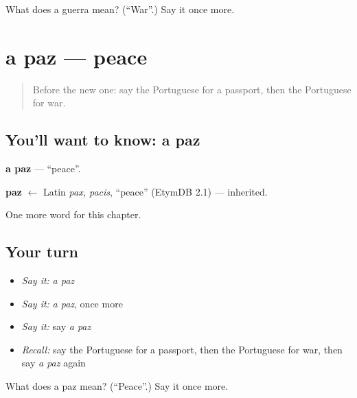 \begin{tcolorbox}[breakable,colback=teal!4,colframe=teal!35!black,title={Before you move on}]
What does a guerra mean? (\textquotedblleft{}War\textquotedblright{}.) Say it once more.
\end{tcolorbox}
\section[a paz]{a paz — peace}

\label{lesson:PT-C219-paz}



\begin{quote}
Before the new one: say the Portuguese for a passport, then the Portuguese for war.
\end{quote}

\subsection*{You'll want to know: a paz}
\textbf{a paz} — \textquotedblleft{}peace\textquotedblright{}.

\begin{cousinweb}
\textbf{paz} $\leftarrow$ Latin \emph{pax, pacis}, \textquotedblleft{}peace\textquotedblright{} (EtymDB 2.1) — inherited.
\end{cousinweb}

\begin{grammarlens}[title={What you've built}]
One more word for this chapter.
\end{grammarlens}

\subsection*{Your turn}
\begin{itemize}
\raggedright
  \item \emph{Say it:} \emph{a paz}
  \item \emph{Say it:} \emph{a paz}, once more
  \item \emph{Say it:} say \emph{a paz}
  \item \emph{Recall:} say the Portuguese for a passport, then the Portuguese for war, then say \emph{a paz} again
\end{itemize}

\begin{tcolorbox}[breakable,colback=teal!4,colframe=teal!35!black,title={Before you move on}]
What does a paz mean? (\textquotedblleft{}Peace\textquotedblright{}.) Say it once more.
\end{tcolorbox}
